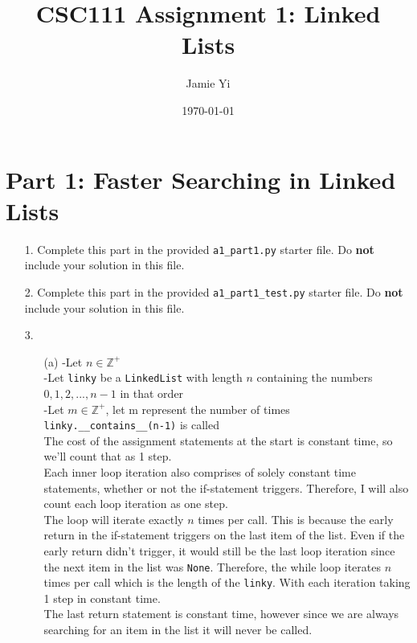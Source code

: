 \documentclass[fontsize=11pt]{article}
\title{CSC111 Assignment 1: Linked Lists}
\author{Jamie Yi}
\date{\today}
\begin{document}
\maketitle

\section*{Part 1: Faster Searching in Linked Lists}

\begin{enumerate}

\item[1.]
Complete this part in the provided \texttt{a1\_part1.py} starter file.
Do \textbf{not} include your solution in this file.

\item[2.]
Complete this part in the provided \texttt{a1\_part1\_test.py} starter file.
Do \textbf{not} include your solution in this file.

\item[3.]
\begin{enumerate}

    \item[(a)]
    -Let $n \in \mathbb{Z}^+$ \\
    -Let \texttt{linky} be a \texttt{LinkedList} with length $n$ containing the numbers $0, 1, 2,..., n-1$ in that order \\
    -Let $m \in \mathbb{Z}^+$, let m represent the number of times \texttt{linky.\_\_contains\_\_(n-1)} is called \\

    The cost of the assignment statements at the start is constant time, so we'll count that as 1 step.\\

    Each inner loop iteration also comprises of solely constant time statements, whether or not the if-statement triggers. Therefore, I will also count each loop iteration as one step.\\
    The loop will iterate exactly $n$ times per call. This is because the early return in the if-statement triggers on the last item of the list. Even if the early return didn't trigger, it would still be the last loop iteration since the next item in the list was \texttt{None}. Therefore, the while loop iterates $n$ times per call which is the length of the \texttt{linky}. With each iteration taking 1 step in constant time.\\

    The last return statement is constant time, however since we are always searching for an item in the list it will never be called.\\


\end{enumerate}
\end{enumerate}
\end{document}
